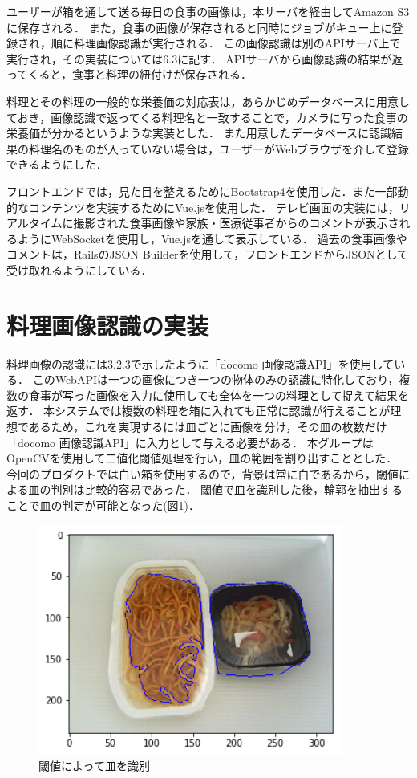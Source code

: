 \documentclass[../report]{subfiles}
\begin{document}
ユーザーが箱を通して送る毎日の食事の画像は，本サーバを経由してAmazon S3に保存される．
また，食事の画像が保存されると同時にジョブがキュー上に登録され，順に料理画像認識が実行される．
この画像認識は別のAPIサーバ上で実行され，その実装については6.3に記す．
APIサーバから画像認識の結果が返ってくると，食事と料理の紐付けが保存される．

料理とその料理の一般的な栄養価の対応表は，あらかじめデータベースに用意しておき，画像認識で返ってくる料理名と一致することで，カメラに写った食事の栄養価が分かるというような実装とした．
また用意したデータベースに認識結果の料理名のものが入っていない場合は，ユーザーがWebブラウザを介して登録できるようにした．

フロントエンドでは，見た目を整えるためにBootstrap4を使用した．また一部動的なコンテンツを実装するためにVue.jsを使用した．
テレビ画面の実装には，リアルタイムに撮影された食事画像や家族・医療従事者からのコメントが表示されるようにWebSocketを使用し，Vue.jsを通して表示している．
過去の食事画像やコメントは，RailsのJSON Builderを使用して，フロントエンドからJSONとして受け取れるようにしている．


\section{料理画像認識の実装}
料理画像の認識には3.2.3で示したように「docomo 画像認識API」を使用している．
このWebAPIは一つの画像につき一つの物体のみの認識に特化しており，複数の食事が写った画像を入力に使用しても全体を一つの料理として捉えて結果を返す．
本システムでは複数の料理を箱に入れても正常に認識が行えることが理想であるため，これを実現するには皿ごとに画像を分け，その皿の枚数だけ「docomo 画像認識API」に入力として与える必要がある．
本グループはOpenCVを使用して二値化閾値処理を行い，皿の範囲を割り出すこととした．
今回のプロダクトでは白い箱を使用するので，背景は常に白であるから，閾値による皿の判別は比較的容易であった．
閾値で皿を識別した後，輪郭を抽出することで皿の判定が可能となった(図\ref{fig:6-threshold})．

\begin{figure}[htbp]
    \begin{center}
        \includegraphics[width=10cm]{imgs/6-threshold.png}
        \caption{閾値によって皿を識別}
        \label{fig:6-threshold}
    \end{center}
\end{figure}
\end{document}
